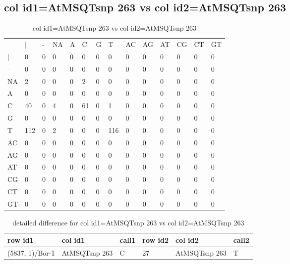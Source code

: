 \subsection{col id1=AtMSQTsnp 263 vs col id2=AtMSQTsnp 263}
\begin{center}
\begin{longtable}{|l|l|l|l|l|l|l|l|l|l|l|l|l|l|}
\caption{col id1=AtMSQTsnp 263 vs col id2=AtMSQTsnp 263} \label{table_dm802}\\
\hline
\\
\hline
&$|$&-&NA&A&C&G&T&AC&AG&AT&CG&CT&GT\\
$|$&0&0&0&0&0&0&0&0&0&0&0&0&0\\
-&0&0&0&0&0&0&0&0&0&0&0&0&0\\
NA&2&0&0&0&2&0&0&0&0&0&0&0&0\\
A&0&0&0&0&0&0&0&0&0&0&0&0&0\\
C&40&0&4&0&61&0&1&0&0&0&0&0&0\\
G&0&0&0&0&0&0&0&0&0&0&0&0&0\\
T&112&0&2&0&0&0&116&0&0&0&0&0&0\\
AC&0&0&0&0&0&0&0&0&0&0&0&0&0\\
AG&0&0&0&0&0&0&0&0&0&0&0&0&0\\
AT&0&0&0&0&0&0&0&0&0&0&0&0&0\\
CG&0&0&0&0&0&0&0&0&0&0&0&0&0\\
CT&0&0&0&0&0&0&0&0&0&0&0&0&0\\
GT&0&0&0&0&0&0&0&0&0&0&0&0&0\\
\hline
\end{longtable}
\end{center}

\begin{center}
\begin{longtable}{|l|l|l|l|l|l|}
\caption{detailed difference for col id1=AtMSQTsnp 263 vs col id2=AtMSQTsnp 263} \label{table_dm803}\\
\hline
row id1&col id1&call1&row id2&col id2&call2\\
\hline
(5837, 1)/Bor-1&AtMSQTsnp 263&C&27&AtMSQTsnp 263&T\\
\hline
\end{longtable}
\end{center}

